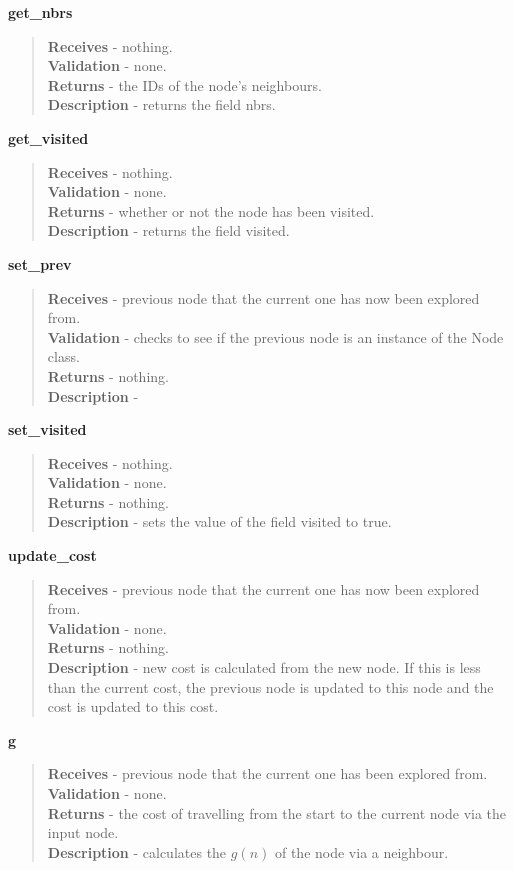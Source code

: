 \documentclass[titlepage]{article}
\begin{document}
\textbf{get\_nbrs}
\begin{quote}
\textbf{Receives} - nothing. \\
\textbf{Validation} - none.\\
\textbf{Returns} - the IDs of the node's neighbours. \\
\textbf{Description} - returns the field nbrs.
\end{quote}

\textbf{get\_visited}
\begin{quote}
\textbf{Receives} - nothing. \\
\textbf{Validation} - none.\\
\textbf{Returns} - whether or not the node has been visited. \\
\textbf{Description} - returns the field visited.
\end{quote}

\textbf{set\_prev}
\begin{quote}
\textbf{Receives} - previous node that the current one has now been explored from. \\
\textbf{Validation} - checks to see if the previous node is an instance of the Node class.\\
\textbf{Returns} - nothing. \\
\textbf{Description} - 
\end{quote}

\textbf{set\_visited}
\begin{quote}
\textbf{Receives} - nothing. \\
\textbf{Validation} - none.\\
\textbf{Returns} - nothing. \\
\textbf{Description} - sets the value of the field visited to true.
\end{quote}

\textbf{update\_cost}
\begin{quote}
\textbf{Receives} - previous node that the current one has now been explored from. \\
\textbf{Validation} - none.\\
\textbf{Returns} - nothing. \\
\textbf{Description} - new cost is calculated from the new node. If this is less than the current cost, the previous node is updated to this node and the cost is updated to this cost.
\end{quote}

\textbf{g}
\begin{quote}
\textbf{Receives} - previous node that the current one has been explored from. \\
\textbf{Validation} - none.\\
\textbf{Returns} - the cost of travelling from the start to the current node via the input node. \\
\textbf{Description} - calculates the $g(n)$ of the node via a neighbour.
\end{quote}
\end{document}
